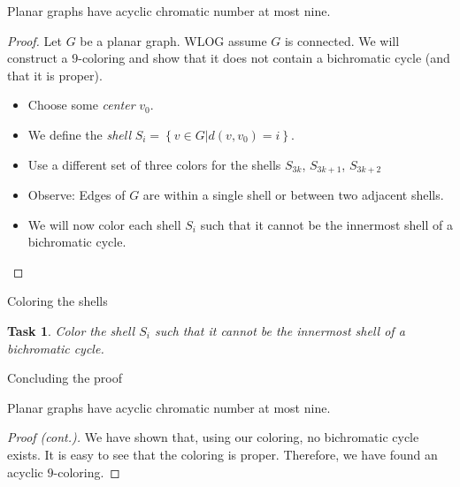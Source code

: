 \documentclass[t]{beamer}
\newtheorem{task}{Task}
\begin{document}
\begin{frame}
    \begin{theorem}[Grünbaum 1972]
	Planar graphs have acyclic chromatic number at most nine.
    \end{theorem}
    \pause
    \begin{proof}
	Let $G$ be a planar graph. \pause WLOG assume $G$ is connected. \pause We will construct a $9$-coloring and show that it does not contain a bichromatic cycle \pause (and that it is proper).
	\begin{itemize}
		\pause
	    \item Choose some \textit{center} $v_0$.
		\pause
	    \item We define the \emph{shell} $S_i = \left\{v \in G | d(v, v_0)=i\right\}$. 
		\pause
	    \item Use a different set of three colors for the shells $S_{3k}$, $S_{3k+1}$, $S_{3k+2}$
		\pause
	    \item Observe: Edges of $G$ are within a single shell or between two adjacent shells.
		\pause
	    \item We will now color each shell $S_i$ such that it cannot be the innermost shell of a bichromatic cycle.
	\end{itemize}
	\phantom\qedhere
    \end{proof}
\end{frame}

\begin{frame}[plain]{Coloring the shells}
    \begin{task}
	Color the shell $S_i$ such that it cannot be the innermost shell of a bichromatic cycle.
    \end{task}
\end{frame}

\begin{frame}{Concluding the proof}
    \begin{theorem}[Grünbaum 1972]
	Planar graphs have acyclic chromatic number at most nine.
    \end{theorem}
    \pause
    \begin{proof}[Proof (cont.)]
	We have shown that, using our coloring, no bichromatic cycle exists. \pause It is easy to see that the coloring is proper. \pause Therefore, we have found an acyclic $9$-coloring.
    \end{proof}
\end{frame}
\end{document}
